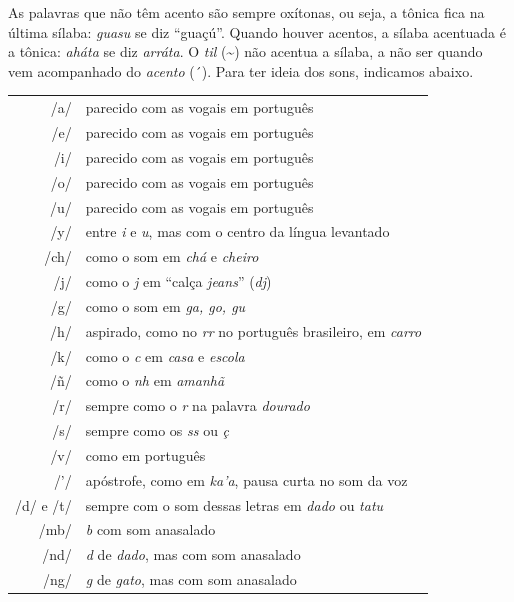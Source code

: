 As palavras que não têm acento são sempre oxítonas, ou seja, a tônica
fica na última sílaba: \textit{guasu} se diz ``guaçú''. Quando houver
acentos, a sílaba acentuada é a tônica: \textit{aháta} se diz
\textit{arráta}. O \textit{til} (\textasciitilde{}) não acentua a sílaba, a não ser
quando vem acompanhado do \textit{acento} (´). Para ter ideia dos sons, indicamos abaixo.

\bigskip

\begingroup
\begin{tabular}{rl}
/a/ & parecido com as vogais em português\\
/e/ & parecido com as vogais em português\\
/i/ & parecido com as vogais em português\\
/o/ & parecido com as vogais em português\\
/u/ & parecido com as vogais em português\\
/y/ & entre \textit{i} e \textit{u}, mas com o centro da língua levantado\\
/ch/ & como o som em \textit{chá} e \textit{cheiro}\\
/j/ & como o \textit{j} em ``calça \textit{jeans}'' (\textit{dj})\\
/g/ & como o som em \textit{ga, go, gu }\\
/h/ & aspirado, como no \textit{rr} no português brasileiro, em \textit{carro}\\
/k/ & como o \textit{c} em \textit{casa} e \textit{escola}\\
/ñ/ & como o \textit{nh} em \textit{amanhã}\\
/r/ & sempre como o \textit{r} na palavra \textit{dourado}\\
/s/ & sempre como os \textit{ss} ou \textit{ç}\\
/v/ & como em português\\
/'/ & apóstrofe, como em \textit{ka'a}, pausa curta no som da voz\\
/d/ e /t/ & sempre com o som dessas letras em \textit{dado} ou \textit{tatu}\\
/mb/ & \textit{b} com som anasalado\\
/nd/ & \textit{d} de \textit{dado}, mas com som anasalado\\
/ng/ & \textit{g} de \textit{gato}, mas com som anasalado
\end{tabular}
\endgroup






